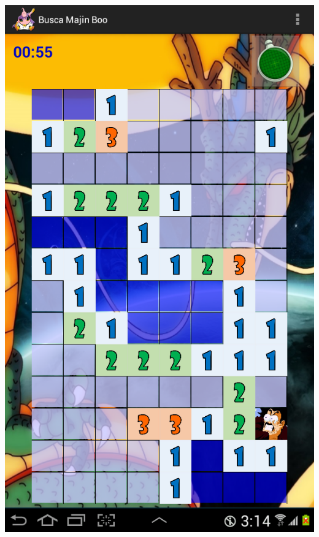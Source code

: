 \documentclass[11pt]{article} %
\begin{document}
\begin{center}
\includegraphics[scale=0.2]{Imagenes/SSCustom.png}
\end{center}
\end{document}
